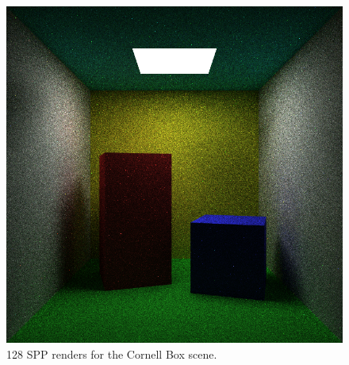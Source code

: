 \documentclass[ %
                    author={Callum Pearce},
                supervisor={Dr. Neill Campbell},
                    degree={MEng},
                     title={Learning the incident radiance for a continuous state space rather than a discrete one is more beneficial for Importance Sampling in Monte Carlo Path tracing},
                  subtitle={},
                      type={research},
                      year={2019} ]{dissertation}
\begin{document}
\begin{figure}[h]
\endminipage\hspace{1em}
  \includegraphics[width=\textwidth]{images/renders/cornell/nn.png}
\endminipage
\caption{128 SPP renders for the Cornell Box scene.}
\label{fig:cornell}
\end{figure}
\end{document}
